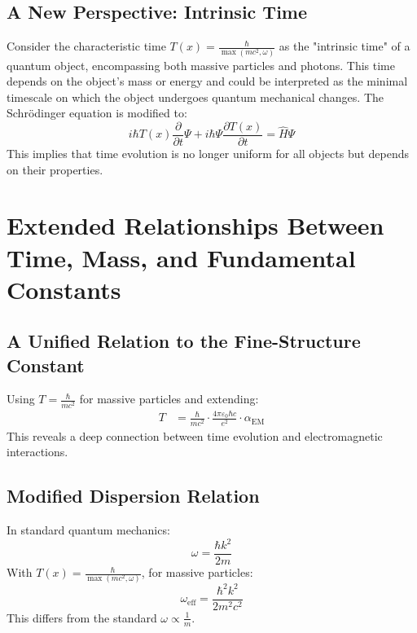 \documentclass[12pt,a4paper]{article}
\newcommand{\Tfield}{T(x)}
\newcommand{\alphaEM}{\alpha_{\text{EM}}}
\begin{document}
	\subsection{A New Perspective: Intrinsic Time}
	Consider the characteristic time \( \Tfield = \frac{\hbar}{\max(m c^2, \omega)} \) as the "intrinsic time" of a quantum object, encompassing both massive particles and photons. This time depends on the object’s mass or energy and could be interpreted as the minimal timescale on which the object undergoes quantum mechanical changes. The Schrödinger equation is modified to:
	\begin{equation}
		i\hbar \Tfield \frac{\partial}{\partial t} \Psi + i\hbar \Psi \frac{\partial \Tfield}{\partial t} = \hat{H} \Psi
	\end{equation}
	This implies that time evolution is no longer uniform for all objects but depends on their properties.
	
	\section{Extended Relationships Between Time, Mass, and Fundamental Constants}
	\subsection{A Unified Relation to the Fine-Structure Constant}
	Using \( T = \frac{\hbar}{mc^2} \) for massive particles and extending:
	\begin{align}
		T &= \frac{\hbar}{mc^2} \cdot \frac{4\pi\varepsilon_0\hbar c}{e^2} \cdot \alphaEM
	\end{align}
	This reveals a deep connection between time evolution and electromagnetic interactions.
	
	\subsection{Modified Dispersion Relation}
	In standard quantum mechanics:
	\begin{equation}
		\omega = \frac{\hbar k^2}{2m}
	\end{equation}
	With \( \Tfield = \frac{\hbar}{\max(m c^2, \omega)} \), for massive particles:
	\begin{equation}
		\omega_{\text{eff}} = \frac{\hbar^2 k^2}{2 m^2 c^2}
	\end{equation}
	This differs from the standard \( \omega \propto \frac{1}{m} \).
	
\end{document}
